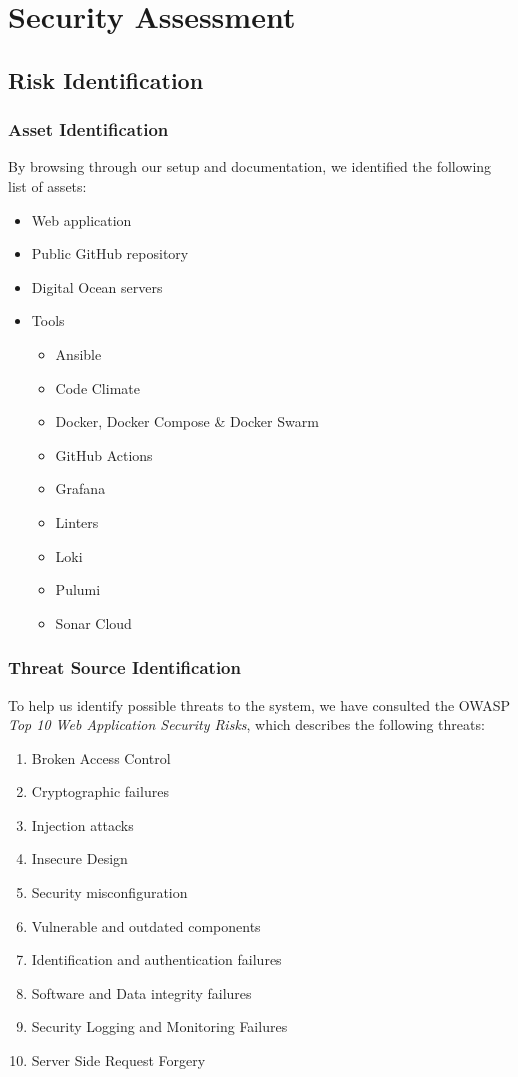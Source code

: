 \section{Security Assessment}
\subsection{Risk Identification}
\subsubsection{Asset Identification}
By browsing through our setup and documentation, we identified the following list of assets:
\begin{itemize}
    \item Web application
    \item Public GitHub repository
    \item Digital Ocean servers
    \item Tools
    \begin{itemize}
        \item Ansible
        \item Code Climate
        \item Docker, Docker Compose \& Docker Swarm
        \item GitHub Actions
        \item Grafana
        \item Linters
        \item Loki
        \item Pulumi
        \item Sonar Cloud
    \end{itemize}
\end{itemize}
\subsubsection{Threat Source Identification}
To help us identify possible threats to the system, we have consulted the OWASP \textit{Top 10 Web Application Security Risks}\cite*{OWASP}, which describes the following threats:
\begin{enumerate}
    \item Broken Access Control
    \item Cryptographic failures
    \item Injection attacks
    \item Insecure Design
    \item Security misconfiguration
    \item Vulnerable and outdated components
    \item Identification and authentication failures
    \item Software and Data integrity failures
    \item Security Logging and Monitoring Failures
    \item Server Side Request Forgery
\end{enumerate}
